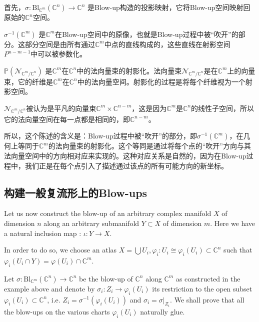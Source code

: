 \begin{remark}
首先，$\sigma: \mathrm{Bl}_{\mathbb{C}^m}\left(\mathbb{C}^n\right) \rightarrow \mathbb{C}^n$ 是Blow-up构造的投影映射，它将Blow-up空间映射回原始的$\mathbb{C}^n$空间。

$\sigma^{-1}\left(\mathbb{C}^m\right)$ 是$\mathbb{C}^m$在Blow-up空间中的原像，也就是Blow-up过程中被“吹开”的部分。这部分空间是由所有通过$\mathbb{C}^m$中点的直线构成的，这些直线在射影空间$P^{n-m-1}$中可以被参数化。

$\mathbb{P}\left(\mathcal{N}_{\mathbb{C}^m / \mathbb{C}^n}\right)$ 是$\mathbb{C}^m$在$\mathbb{C}^n$中的法向量束的射影化。法向量束$\mathcal{N}_{\mathbb{C}^m / \mathbb{C}^n}$是在$\mathbb{C}^m$上的向量束，它的纤维是$\mathbb{C}^m$在$\mathbb{C}^n$中的法向量空间。射影化的过程是将每个纤维视为一个射影空间。

$\mathcal{N}_{\mathbb{C}^m / \mathbb{C}^n}$被认为是平凡的向量束$\mathbb{C}^m \times \mathbb{C}^{n-m}$，这是因为$\mathbb{C}^m$是$\mathbb{C}^n$的线性子空间，所以它的法向量空间在每一点都是相同的，即$\mathbb{C}^{n-m}$。

所以，这个陈述的含义是：Blow-up过程中被“吹开”的部分，即$\sigma^{-1}\left(\mathbb{C}^m\right)$，在几何上等同于$\mathbb{C}^m$的法向量束的射影化。这个等同是通过将每个点的“吹开”方向与其法向量空间中的方向相对应来实现的。这种对应关系是自然的，因为在Blow-up过程中，我们正是在每个点引入了描述通过该点的所有可能方向的新坐标。
\end{remark}


\subsection{构建一般复流形上的Blow-ups}

Let us now construct the blow-up of an arbitrary complex manifold $X$ of dimension $n$ along an arbitrary submanifold $Y \subset X$ of dimension $m$. Here we have a natural inclusion map : $\iota\colon Y\to X$.

In order to do so, we choose an atlas $X=\bigcup U_i, \varphi_i: U_i \cong \varphi_i\left(U_i\right) \subset \mathbb{C}^n$ such that $\varphi_i\left(U_i \cap Y\right)=\varphi\left(U_i\right) \cap \mathbb{C}^m$.

Let $\sigma: \mathrm{Bl}_{\mathbb{C}^m}\left(\mathbb{C}^n\right) \rightarrow \mathbb{C}^n$ be the blow-up of $\mathbb{C}^n$ along $\mathbb{C}^m$ as constructed in the example above and denote by $\sigma_i: Z_i \rightarrow \varphi_i\left(U_i\right)$ its restriction to the open subset $\varphi_i\left(U_i\right) \subset \mathbb{C}^n$, i.e. $Z_i=\sigma^{-1}\left(\varphi_i\left(U_i\right)\right)$ and $\sigma_i=\left.\sigma\right|_{Z_i}$. We shall prove that all the blow-ups on the various charts $\varphi_i\left(U_i\right)$ naturally glue.

